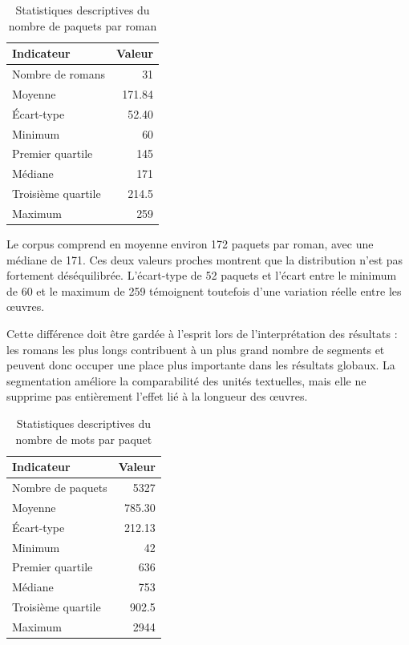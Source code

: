 \begin{table}[H]
\centering
\caption{Statistiques descriptives du nombre de paquets par roman}
\begin{tabular}{lr}
\toprule
\textbf{Indicateur} & \textbf{Valeur} \\
\midrule
Nombre de romans & 31 \\
Moyenne & 171.84 \\
Écart-type & 52.40 \\
Minimum & 60 \\
Premier quartile & 145 \\
Médiane & 171 \\
Troisième quartile & 214.5 \\
Maximum & 259 \\
\bottomrule
\end{tabular}
\end{table}

Le corpus comprend en moyenne environ 172 paquets par roman, avec une médiane de 171. Ces deux valeurs proches montrent que la distribution n'est pas fortement déséquilibrée. L'écart-type de 52 paquets et l'écart entre le minimum de 60 et le maximum de 259 témoignent toutefois d'une variation réelle entre les œuvres.

Cette différence doit être gardée à l'esprit lors de l'interprétation des résultats : les romans les plus longs contribuent à un plus grand nombre de segments et peuvent donc occuper une place plus importante dans les résultats globaux. La segmentation améliore la comparabilité des unités textuelles, mais elle ne supprime pas entièrement l'effet lié à la longueur des œuvres.


\begin{table}[H]
\centering
\caption{Statistiques descriptives du nombre de mots par paquet}
\begin{tabular}{lr}
\toprule
\textbf{Indicateur} & \textbf{Valeur} \\
\midrule
Nombre de paquets & 5327 \\
Moyenne & 785.30 \\
Écart-type & 212.13 \\
Minimum & 42 \\
Premier quartile & 636 \\
Médiane & 753 \\
Troisième quartile & 902.5 \\
Maximum & 2944 \\
\bottomrule
\end{tabular}
\end{table}


